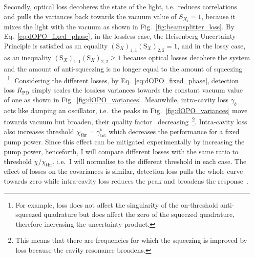 Secondly, optical loss decoheres the state of the light, i.e.\ reduces correlations and pulls the variances back towards the vacuum value of $S_{X_i}=1$, because it mixes the light with the vacuum as shown in Fig.~\ref{fig:beamsplitter_loss}.
By Eq.~\ref{eq:dOPO_fixed_phase}, in the lossless case, the Heisenberg Uncertainty Principle is satisfied as an equality  $(\text{S}_X)_{1,1}(\text{S}_X)_{2,2}=1$, and in the lossy case, as an inequality $(\text{S}_X)_{1,1}(\text{S}_X)_{2,2}\geq1$ because optical losses decohere the system and the amount of anti-squeezing is no longer equal to the amount of squeezing~\cite{} ~\footnote{For example, loss does not affect the singularity of the on-threshold anti-squeezed quadrature but does affect the zero of the squeezed quadrature, therefore increasing the uncertainty product.}.
Considering the different losses, by Eq.~\ref{eq:dOPO_fixed_phase}, detection loss $R_\text{PD}$ simply scales the lossless variances towards the constant vacuum value of one as shown in Fig.~\ref{fig:dOPO_variances}. %
Meanwhile, intra-cavity loss $\gamma_b$ acts like damping an oscillator, i.e.\ the peaks in Fig.~\ref{fig:dOPO_variances} move towards vacuum but broaden, their quality factor~\cite{} decreasing~\footnote{This means that there are frequencies for which the squeezing is improved by loss because the cavity resonance broadens.}.
Intra-cavity loss also increases threshold $\chi_\text{thr}=\gamma^b_\text{tot}$ which decreases the performance for a fixed pump power. Since this effect can be mitigated experimentally by increasing the pump power, henceforth, I will compare different losses with the same ratio to threshold $\chi/\chi_\text{thr}$, i.e.\ I will normalise to the different threshold in each case. %
The effect of losses on the covariances is similar, detection loss pulls the whole curve towards zero while intra-cavity loss reduces the peak and broadens the response~\cite{}.


